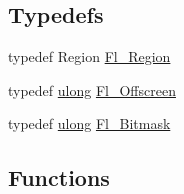 \subsection*{Typedefs}
\begin{DoxyCompactItemize}
\item 
typedef Region \hyperlink{x_8_h_a690c759f08955eddecf1e1014ef37fb8}{Fl\+\_\+\+Region}
\item 
typedef \hyperlink{fl__types_8h_a718b4eb2652c286f4d42dc18a8e71a1a}{ulong} \hyperlink{x_8_h_a709fcd66ef6c01574b6a85cad62a9dc4}{Fl\+\_\+\+Offscreen}
\item 
typedef \hyperlink{fl__types_8h_a718b4eb2652c286f4d42dc18a8e71a1a}{ulong} \hyperlink{x_8_h_a3a976d3779da5b4f61c5857e91aea10f}{Fl\+\_\+\+Bitmask}
\end{DoxyCompactItemize}
\subsection*{Functions}
